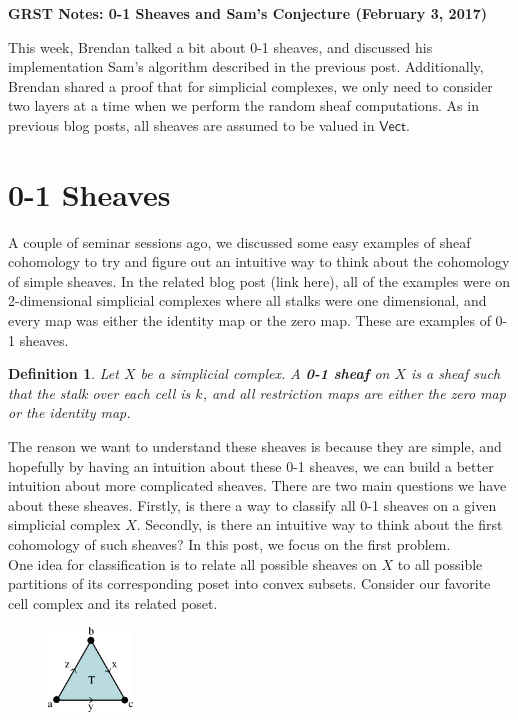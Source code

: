 \documentclass{article}
\newcommand{\clr}{\color{red}}
\newtheorem{definition}{Definition}
\theoremstyle{definition}
\begin{document}
\begin{center}
	\large \textbf{GRST Notes:  0-1 Sheaves and Sam's Conjecture (February 3, 2017)} \\
\end{center}

This week, Brendan talked a bit about 0-1 sheaves, and discussed his implementation Sam's algorithm  described in the previous post. Additionally, Brendan shared a proof that for simplicial complexes, we only need to consider two layers at a time when we perform the random sheaf computations. As in previous blog posts, all sheaves are assumed to be valued in $\textsf{Vect}$.

\section{0-1 Sheaves}
A couple of seminar sessions ago, we discussed some easy examples of sheaf cohomology to try and figure out an intuitive way to think about the cohomology of simple sheaves. In the related blog post {\clr (link here)}, all of the examples were on 2-dimensional simplicial complexes where all stalks were one dimensional, and every map was either the identity map or the zero map. These are examples of 0-1 sheaves.

\begin{definition}
	Let $X$ be a simplicial complex. A \textbf{0-1 sheaf} on $X$ is a sheaf such that the stalk over each cell is $k$, and all restriction maps are either the zero map or the identity map.
\end{definition}

The reason we want to understand these sheaves is because they are simple, and hopefully by having an intuition about these 0-1 sheaves, we can build a better intuition about more complicated sheaves.  There are two main questions we have about these sheaves. Firstly, is there a way to classify all 0-1 sheaves on a given simplicial complex $X$. Secondly, is there an intuitive way to think about the first cohomology of such sheaves? In this post, we focus on the first problem.\\

One idea for classification is to relate all possible sheaves on $X$ to all possible partitions of its corresponding poset into convex subsets. Consider our favorite cell complex and its related poset.

\begin{figure}[!htbp]
\centering
	\includegraphics[width=0.2\textwidth]{images/triangle_dir.png}
\end{figure}
\end{document}
